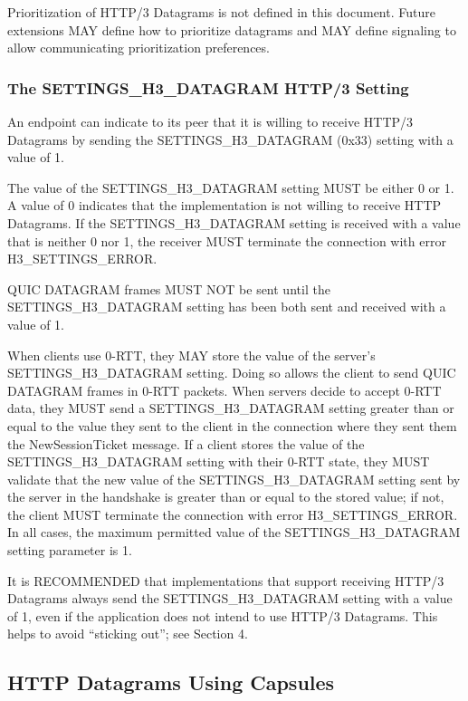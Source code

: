 \documentclass{article}
\begin{document}
Prioritization of HTTP/3 Datagrams is not defined in this document.
Future extensions MAY define how to prioritize datagrams and MAY
define signaling to allow communicating prioritization preferences.

\subsubsection{The SETTINGS\_H3\_DATAGRAM HTTP/3 Setting}

An endpoint can indicate to its peer that it is willing to receive
HTTP/3 Datagrams by sending the SETTINGS\_H3\_DATAGRAM (0x33) setting
with a value of 1.

The value of the SETTINGS\_H3\_DATAGRAM setting MUST be either 0 or 1.
A value of 0 indicates that the implementation is not willing to
receive HTTP Datagrams.  If the SETTINGS\_H3\_DATAGRAM setting is
received with a value that is neither 0 nor 1, the receiver MUST
terminate the connection with error H3\_SETTINGS\_ERROR.

QUIC DATAGRAM frames MUST NOT be sent until the SETTINGS\_H3\_DATAGRAM
setting has been both sent and received with a value of 1.

When clients use 0-RTT, they MAY store the value of the server's
SETTINGS\_H3\_DATAGRAM setting.  Doing so allows the client to send
QUIC DATAGRAM frames in 0-RTT packets.  When servers decide to accept
0-RTT data, they MUST send a SETTINGS\_H3\_DATAGRAM setting greater
than or equal to the value they sent to the client in the connection
where they sent them the NewSessionTicket message.  If a client
stores the value of the SETTINGS\_H3\_DATAGRAM setting with their 0-RTT
state, they MUST validate that the new value of the
SETTINGS\_H3\_DATAGRAM setting sent by the server in the handshake is
greater than or equal to the stored value; if not, the client MUST
terminate the connection with error H3\_SETTINGS\_ERROR.  In all cases,
the maximum permitted value of the SETTINGS\_H3\_DATAGRAM setting
parameter is 1.

It is RECOMMENDED that implementations that support receiving HTTP/3
Datagrams always send the SETTINGS\_H3\_DATAGRAM setting with a value
of 1, even if the application does not intend to use HTTP/3
Datagrams.  This helps to avoid ``sticking out''; see Section 4.

\subsection{HTTP Datagrams Using Capsules}
\end{document}
